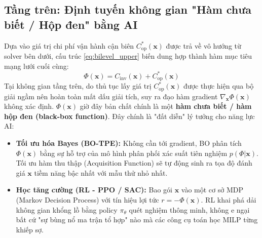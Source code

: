 \subsection{Tầng trên: Định tuyến không gian "Hàm chưa biết / Hộp đen" bằng AI}
Dựa vào giá trị chi phí vận hành cận biên $C_{\mathrm{op}}^*(\mathbf{x})$ được trả về vô hướng từ solver bên dưới, cấu trúc \eqref{eq:bilevel_upper} biến dung hợp thành hàm mục tiêu mạng lưới cuối cùng:
\begin{equation} \label{eq:upper_box_new}
    \Phi(\mathbf{x}) = C_{\mathrm{inv}}(\mathbf{x}) + C_{\mathrm{op}}^*(\mathbf{x})
\end{equation}
Tại không gian tầng trên, do thủ tục lấy giá trị $C_{\mathrm{op}}^*(\mathbf{x})$ được thực hiện qua bộ giải ngầm nên hoàn toàn mất dấu giải tích, suy ra đạo hàm gradient $\nabla_{\mathbf{x}} \Phi(\mathbf{x})$ không xác định. $\Phi(\mathbf{x})$ giờ đây bản chất chính là một \textbf{hàm chưa biết / hàm hộp đen (black-box function)}.
Đây chính là "đất diễn" lý tưởng cho năng lực AI:
\begin{itemize}
    \item \textbf{Tối ưu hóa Bayes (BO-TPE):} Không cần tới gradient, BO phân tích $\Phi(\mathbf{x})$ bằng sự hỗ trợ của mô hình phân phối xác suất tiên nghiệm $p(\Phi | \mathbf{x})$. Tối ưu hàm thu thập (Acquisition Function) sẽ tự động sinh ra tọa độ đánh giá $\mathbf{x}$ tiềm năng bậc nhất với mẫu thử nhỏ nhất.
    \item \textbf{Học tăng cường (RL - PPO / SAC):} Bao gói $\mathbf{x}$ vào một cơ sở MDP (Markov Decision Process) với tín hiệu lợi tức $r = - \Phi(\mathbf{x})$. RL khai phá dải không gian khổng lồ bằng policy $\pi_\theta$ quét nghiệm thông minh, không e ngại bất cứ "sự bùng nổ ma trận tổ hợp" nào mà các công cụ toán học MILP từng khiếp sợ.
\end{itemize}

